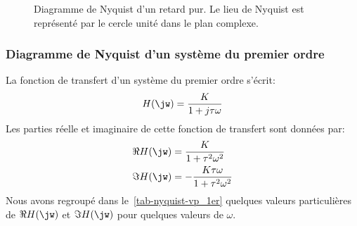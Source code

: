 \begin{figure}[!h]                                                                                                           
\begin{center}                                                                                                               
\end{center}
\caption{Diagramme de Nyquist d'un retard pur. Le lieu de Nyquist 
    est représenté par le cercle unité dans le plan complexe.\label{fig-nyquist_4}}
\end{figure}

\newpage
\subsubsection{Diagramme de Nyquist d'un système du premier ordre}
La fonction de transfert d'un système du premier ordre s'écrit:
$$
H(\jw)=\dfrac{K}{1+j\tau\omega}
$$
Les parties réelle et imaginaire de cette fonction de transfert sont données par:
\begin{align*}
    \Re{H(\jw)}&=\dfrac{K}{1+\tau^2\omega^2}\\
    \Im{H(\jw)}&=-\dfrac{K\tau\omega}{1+\tau^2\omega^2}\\
\end{align*}
Nous avons regroupé dans le~\cref{tab-nyquist-vp_1er} quelques valeurs particulières 
de $\Re{H(\jw)}$ et $\Im{H(\jw)}$ pour quelques valeurs de $\omega$.

